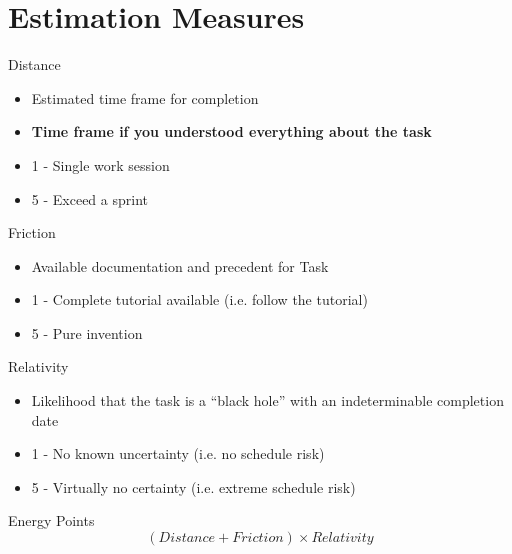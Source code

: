 \documentclass[aspectratio=169]{beamer}
\begin{document}
\section{Estimation Measures}
\begin{frame}{Distance}
    \begin{itemize}
        \item Estimated time frame for completion
        \item \textbf{Time frame if you understood everything about the task}
        \item 1 - Single work session
        \item 5 - Exceed a sprint
    \end{itemize}
\end{frame}
\begin{frame}{Friction}
    \begin{itemize}
        \item Available documentation and precedent for Task
        \item 1 - Complete tutorial available (i.e. follow the tutorial)
        \item 5 - Pure invention
    \end{itemize}
\end{frame}
\begin{frame}{Relativity}
    \begin{itemize}
        \item Likelihood that the task is a ``black hole'' with an indeterminable completion date
        \item 1 - No known uncertainty (i.e. no schedule risk)
        \item 5 - Virtually no certainty (i.e. extreme schedule risk)
    \end{itemize}
\end{frame}
\begin{frame}{Energy Points}
    $$(Distance + Friction) \times Relativity$$
\end{frame}
\end{document}
